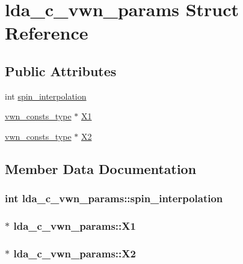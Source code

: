 \hypertarget{structlda__c__vwn__params}{\section{lda\-\_\-c\-\_\-vwn\-\_\-params Struct Reference}
\label{structlda__c__vwn__params}
}
\subsection*{Public Attributes}
\begin{DoxyCompactItemize}
\item 
int \hyperlink{structlda__c__vwn__params_a3c037d8198b3662261b7540c5062ad7a}{spin\-\_\-interpolation}
\item 
\hyperlink{structvwn__consts__type}{vwn\-\_\-consts\-\_\-type} $\ast$ \hyperlink{structlda__c__vwn__params_a03497f7b57eb67fa4b8f783114ff24ac}{X1}
\item 
\hyperlink{structvwn__consts__type}{vwn\-\_\-consts\-\_\-type} $\ast$ \hyperlink{structlda__c__vwn__params_acb645e9aca006c3d670b649520569b8a}{X2}
\end{DoxyCompactItemize}


\subsection{Member Data Documentation}
\hypertarget{structlda__c__vwn__params_a3c037d8198b3662261b7540c5062ad7a}{
\subsubsection[{spin\-\_\-interpolation}]{\setlength{\rightskip}{0pt plus 5cm}int lda\-\_\-c\-\_\-vwn\-\_\-params\-::spin\-\_\-interpolation}}\label{structlda__c__vwn__params_a3c037d8198b3662261b7540c5062ad7a}
\hypertarget{structlda__c__vwn__params_a03497f7b57eb67fa4b8f783114ff24ac}{
\subsubsection[{X1}]{$\ast$ lda\-\_\-c\-\_\-vwn\-\_\-params\-::\-X1}}\label{structlda__c__vwn__params_a03497f7b57eb67fa4b8f783114ff24ac}
\hypertarget{structlda__c__vwn__params_acb645e9aca006c3d670b649520569b8a}{
\subsubsection[{X2}]{ $\ast$ lda\-\_\-c\-\_\-vwn\-\_\-params\-::\-X2}}\label{structlda__c__vwn__params_acb645e9aca006c3d670b649520569b8a}


